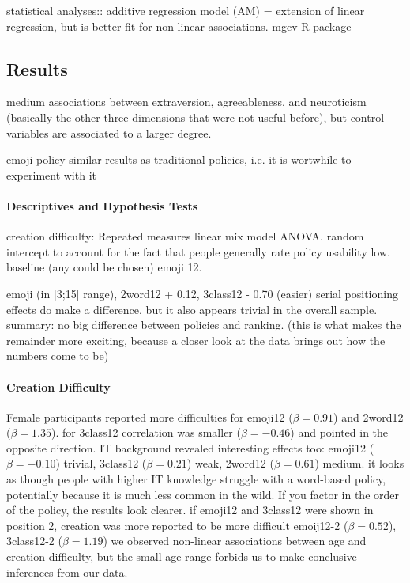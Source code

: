 statistical analyses::
additive regression model (AM) = extension of linear regression, but is better fit for non-linear associations.
mgcv R package


\subsection{Results}
medium associations between extraversion, agreeableness, and neuroticism (basically the other three dimensions that were not useful before), but control variables are associated to a larger degree.

emoji policy similar results as traditional policies, i.e. it is wortwhile to experiment with it

\paragraph{Descriptives and Hypothesis Tests}
creation difficulty: Repeated measures linear mix model ANOVA. random intercept to account for the fact that people generally rate policy usability low. baseline (any could be chosen) emoji 12.

emoji  (in [3;15] range), 2word12 + 0.12, 3class12 - 0.70 (easier)
serial positioning effects do make a difference, but it also appears trivial in the overall sample.
summary: no big difference between policies and ranking. (this is what makes the remainder more exciting, because a closer look at the data brings out how the numbers come to be)


\paragraph{Creation Difficulty}
Female participants reported more difficulties for emoji12 ($\beta=0.91$) and 2word12 ($\beta=1.35$). 
for 3class12 correlation was smaller ($\beta=-0.46$) and pointed in the opposite direction.
IT background revealed interesting effects too: emoji12 ($\beta=-0.10$) trivial, 3class12 ($\beta=0.21$) weak, 2word12 ($\beta=0.61$) medium. it looks as though people with higher IT knowledge struggle with a word-based policy, potentially because it is much less common in the wild. 
If you factor in the order of the policy, the results look clearer. if emoji12 and 3class12 were shown in position 2, creation was more reported to be more difficult emoij12-2 ($\beta=0.52$), 3class12-2 ($\beta=1.19$) 
we observed non-linear associations between age and creation difficulty, but the small age range forbids us to make conclusive inferences from our data.

